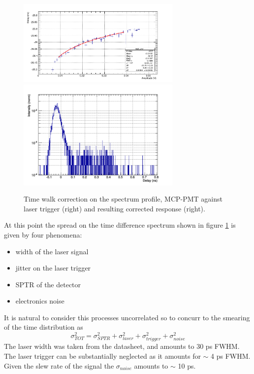 \begin{figure}[htbp]
\begin{center}
\includegraphics[width=8cm]{../Pictures/Chapter_8/time_walk_corr.png}
\includegraphics[width=8cm]{../Pictures/Chapter_8/laser.png}
\end{center}
\caption[MCP corrected response (laser trigger)]{Time walk correction on the spectrum profile, MCP-PMT against laser trigger (right) and resulting corrected response (right).}
\label{fig:mcp_laser_walk}
\end{figure}
At this point the spread on the time difference spectrum shown in figure \ref{fig:mcp_laser_walk} is given by four phenomena:
\begin{itemize}
\item width of the laser signal
\item jitter on the laser trigger
\item SPTR of the detector
\item electronics noise
\end{itemize}
It is natural to consider this processes uncorrelated so to concurr to the smearing of the time distribution as
\begin{equation}
\sigma _{TOT}^{2} = \sigma _{SPTR}^{2} + \sigma _{laser}^{2} + \sigma _{trigger}^{2} + \sigma _{noise}^{2} 
\end{equation}
The laser width was taken from the datasheet, and amounts to 30 ps FWHM. The laser trigger can be substantially neglected as it amounts for $\sim$ 4 ps FWHM. Given the slew rate of the signal the $\sigma _{noise}$ amounts to $\sim$ 10 ps.

